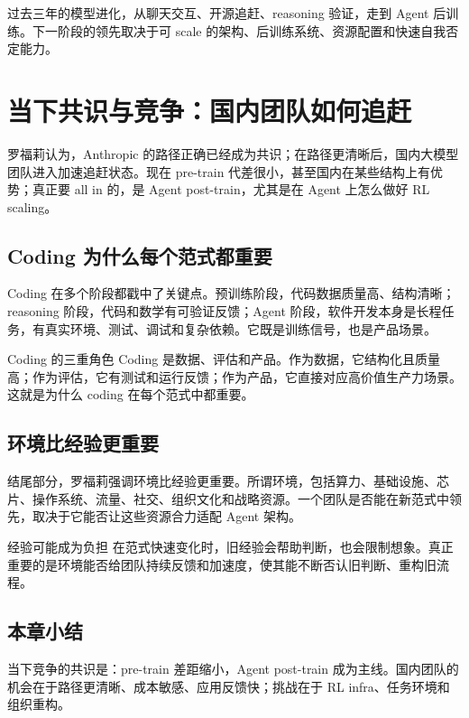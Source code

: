 \documentclass[a4paper]{article}
\begin{document}
过去三年的模型进化，从聊天交互、开源追赶、reasoning 验证，走到 Agent 后训练。下一阶段的领先取决于可 scale 的架构、后训练系统、资源配置和快速自我否定能力。

\section{当下共识与竞争：国内团队如何追赶}

罗福莉认为，Anthropic 的路径正确已经成为共识；在路径更清晰后，国内大模型团队进入加速追赶状态。现在 pre-train 代差很小，甚至国内在某些结构上有优势；真正要 all in 的，是 Agent post-train，尤其是在 Agent 上怎么做好 RL scaling。

\subsection{Coding 为什么每个范式都重要}

Coding 在多个阶段都戳中了关键点。预训练阶段，代码数据质量高、结构清晰；reasoning 阶段，代码和数学有可验证反馈；Agent 阶段，软件开发本身是长程任务，有真实环境、测试、调试和复杂依赖。它既是训练信号，也是产品场景。

\begin{importantbox}{Coding 的三重角色}
Coding 是数据、评估和产品。作为数据，它结构化且质量高；作为评估，它有测试和运行反馈；作为产品，它直接对应高价值生产力场景。这就是为什么 coding 在每个范式中都重要。
\end{importantbox}

\subsection{环境比经验更重要}

结尾部分，罗福莉强调环境比经验更重要。所谓环境，包括算力、基础设施、芯片、操作系统、流量、社交、组织文化和战略资源。一个团队是否能在新范式中领先，取决于它能否让这些资源合力适配 Agent 架构。

\begin{warningbox}{经验可能成为负担}
在范式快速变化时，旧经验会帮助判断，也会限制想象。真正重要的是环境能否给团队持续反馈和加速度，使其能不断否认旧判断、重构旧流程。
\end{warningbox}

\subsection{本章小结}

当下竞争的共识是：pre-train 差距缩小，Agent post-train 成为主线。国内团队的机会在于路径更清晰、成本敏感、应用反馈快；挑战在于 RL infra、任务环境和组织重构。
\end{document}
